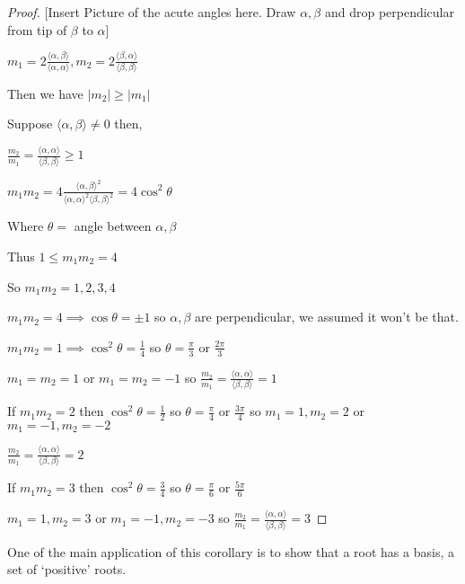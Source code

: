 \documentclass{article}
\theoremstyle{definition}
\begin{document}
\begin{proof}

    [Insert Picture of the acute angles here. Draw \(\alpha ,\beta \) and drop perpendicular from tip of \(\beta\) to \(\alpha\)]

    \(m_1 = 2 \frac{\langle \alpha ,\beta  \rangle }{\langle \alpha ,\alpha  \rangle },m_2=2\frac{\langle \beta ,\alpha  \rangle }{\langle \beta ,\beta  \rangle }\) 

    Then we have \(\vert m_2 \vert \geq \vert m_1 \vert \) 

    Suppose \(\langle \alpha ,\beta  \rangle \neq 0\) then,

    \(\frac{m_2}{m_1}=\frac{\langle \alpha ,\alpha  \rangle }{\langle \beta ,\beta  \rangle }\geq 1\) 

    \(m_1 m_2=4 \frac{\langle \alpha ,\beta  \rangle ^2}{\langle \alpha ,\alpha  \rangle^2 \langle \beta ,\beta  \rangle ^2}=4\cos^2\theta \) 

    Where \(\theta =\) angle between \(\alpha ,\beta \) 

    Thus \(1 \leq m_1 m_2 =4 \) 

    So \(m_1 m_2 = 1,2,3,4\) 

    \(m_1 m_2 = 4 \implies \cos\theta = \pm 1 \) so \(\alpha ,\beta \) are perpendicular, we assumed it won't be that.

    \(m_1 m_2 = 1 \implies \cos^2\theta = \frac{1}{4}\) so \(\theta = \frac{\pi}{3}\) or \(\frac{2\pi}{3}\) 

    \(m_1 = m_2 = 1\) or \(m_1 = m_2 = -1\) so \(\frac{m_2}{m_1}=\frac{\langle \alpha ,\alpha  \rangle }{\langle \beta ,\beta  \rangle }=1\)
    
    If \(m_1 m_2 = 2\) then \(\cos^2\theta = \frac{1}{2}\) so \(\theta = \frac{\pi}{4}\) or \(\frac{3\pi}{4}\) so \(m_1=1,m_2=2 \) or \(m_1=-1,m_2=-2\) 

    \(\frac{m_2}{m_1}=\frac{\langle \alpha ,\alpha \rangle }{\langle \beta ,\beta  \rangle }=2\) 

    If \(m_1 m_2 = 3\) then \(\cos^2\theta = \frac{3}{4}\) so \(\theta = \frac{\pi}{6}\) or \(\frac{5\pi}{6}\) 

    \(m_1 =1, m_2=3\) or \(m_1 = -1,m_2=-3\) so \(\frac{m_2}{m_1}=\frac{\langle \alpha ,\alpha  \rangle }{\langle \beta ,\beta  \rangle }=3\) 

\end{proof}

One of the main application of this corollary is to show that a root has a basis, a set of `positive' roots.
\end{document}
